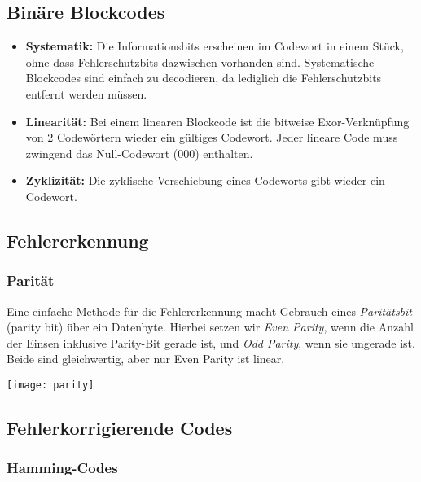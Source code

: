 \subsection{Binäre Blockcodes}\label{subsec:binaere-blockcodes}

\begin{itemize}
    \item \textbf{Systematik:} Die Informationsbits erscheinen im Codewort in einem Stück, ohne dass Fehlerschutzbits dazwischen vorhanden sind.
    Systematische Blockcodes sind einfach zu decodieren, da lediglich die Fehlerschutzbits entfernt werden müssen.
    \item \textbf{Linearität:} Bei einem linearen Blockcode ist die bitweise Exor-Verknüpfung von 2 Codewörtern wieder ein gültiges Codewort.
    Jeder lineare Code muss zwingend das Null-Codewort (000) enthalten.
    \item \textbf{Zyklizität:} Die zyklische Verschiebung eines Codeworts gibt wieder ein Codewort.
\end{itemize}

\subsection{Fehlererkennung}\label{subsec:fehlererkennung}

\subsubsection{Parität}

Eine einfache Methode für die Fehlererkennung macht Gebrauch eines \emph{Paritätsbit} (parity bit) über ein Datenbyte.
Hierbei setzen wir \emph{Even Parity}, wenn die Anzahl der Einsen inklusive Parity-Bit gerade ist, und \emph{Odd Parity}, wenn sie ungerade ist.
Beide sind gleichwertig, aber nur Even Parity ist linear.
\begin{center}
    \texttt{[image: parity]}
\end{center}

\subsection{Fehlerkorrigierende Codes}\label{subsec:fehlerkorrigierende-codes}

\subsubsection{Hamming-Codes}

